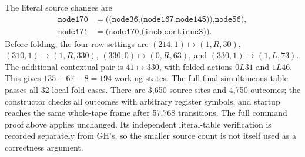 The literal source changes are
\[
\begin{split}
\texttt{node170}&=\texttt{((node36,(node167,node145)),node56)},\\
\texttt{node171}&=\texttt{(node170,(inc5,continue3))}.
\end{split}
\]
Before folding, the four row settings are
$(214,1)\mapsto(1,R,30)$, $(310,1)\mapsto(1,R,330)$,
$(330,0)\mapsto(0,R,63)$, and $(330,1)\mapsto(1,L,73)$.
The additional contextual pair is $41\mapsto330$, with folded actions
$0L31$ and $1L46$. This gives $135+67-8=194$ working states.
The full final simultaneous table passes all 32 local fold cases.
There are 3,650 source sites and 4,750 outcomes; the constructor checks
all outcomes with arbitrary register symbols, and startup reaches the
same whole-tape frame after 57,768 transitions. The full command proof
above applies unchanged. Its independent literal-table verification is
recorded separately from GH's, so the smaller source count is not itself
used as a correctness argument.

